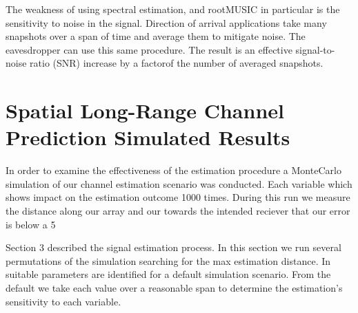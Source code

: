 \documentclass{allertonproc}
\begin{document}



The weakness of using spectral estimation, and rootMUSIC in particular is the sensitivity to noise in the signal. Direction of arrival applications take many snapshots over a span of time and average them to mitigate noise. The eavesdropper can use this same procedure. The result is an effective signal-to-noise ratio (SNR) increase by a factorof the number of averaged snapshots. 



\section{Spatial Long-Range Channel Prediction Simulated Results}\label{simresults}

In order to examine the effectiveness of the estimation procedure a MonteCarlo simulation of our channel estimation scenario was conducted. Each variable which shows impact on the estimation outcome 1000 times. During this run we measure the distance along our array and our towards the intended reciever that our error is below a 5%

Section 3 described the signal estimation process. In this section we run several permutations of the simulation searching for the max estimation distance. In \cite{kckpVTC2015} suitable parameters are identified for a default simulation scenario.  %
From the default we take each value over a reasonable span to determine the estimation's sensitivity to each variable. 

\end{document}
